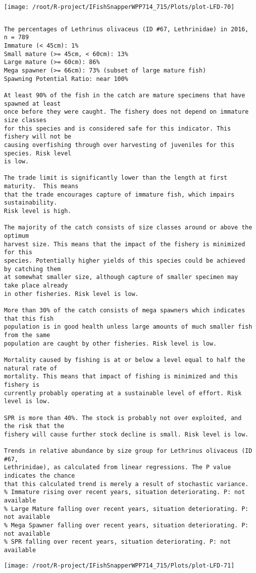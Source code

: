 \documentclass{report}\usepackage[]{graphicx}\usepackage[]{color}
\makeatletter
\def\maxwidth{ %
  \ifdim\Gin@nat@width>\linewidth
    \linewidth
  \else
    \Gin@nat@width
  \fi
}
\newenvironment{kframe}{%
 \def\at@end@of@kframe{}%
 \ifinner\ifhmode%
  \def\at@end@of@kframe{\end{minipage}}%
  \begin{minipage}{\columnwidth}%
 \fi\fi%
 \def\FrameCommand##1{\hskip\@totalleftmargin \hskip-\fboxsep
 \colorbox{shadecolor}{##1}\hskip-\fboxsep
     \hskip-\linewidth \hskip-\@totalleftmargin \hskip\columnwidth}%
 \MakeFramed {\advance\hsize-\width
   \@totalleftmargin\z@ \linewidth\hsize
   \@setminipage}}%
 {\par\unskip\endMakeFramed%
 \at@end@of@kframe}
\newenvironment{knitrout}{}{} %
\makeatother
\begin{document}
\begin{knitrout}
\texttt{[image: /root/R-project/IFishSnapperWPP714\_715/Plots/plot-LFD-70]} 
\begin{kframe}\begin{verbatim}
\end{verbatim}
\end{kframe}
\clearpage
\newpage
\begin{kframe}\begin{verbatim}The percentages of Lethrinus olivaceus (ID #67, Lethrinidae) in 2016, n = 789
Immature (< 45cm): 1%
Small mature (>= 45cm, < 60cm): 13%
Large mature (>= 60cm): 86%
Mega spawner (>= 66cm): 73% (subset of large mature fish)
Spawning Potential Ratio: near 100%
 
At least 90% of the fish in the catch are mature specimens that have spawned at least
once before they were caught. The fishery does not depend on immature size classes
for this species and is considered safe for this indicator. This fishery will not be
causing overfishing through over harvesting of juveniles for this species. Risk level
is low.

The trade limit is significantly lower than the length at first maturity.  This means
that the trade encourages capture of immature fish, which impairs sustainability.
Risk level is high.

The majority of the catch consists of size classes around or above the optimum
harvest size. This means that the impact of the fishery is minimized for this
species. Potentially higher yields of this species could be achieved by catching them
at somewhat smaller size, although capture of smaller specimen may take place already
in other fisheries. Risk level is low.

More than 30% of the catch consists of mega spawners which indicates that this fish
population is in good health unless large amounts of much smaller fish from the same
population are caught by other fisheries. Risk level is low.
 
Mortality caused by fishing is at or below a level equal to half the natural rate of
mortality. This means that impact of fishing is minimized and this fishery is
currently probably operating at a sustainable level of effort. Risk level is low.
 
SPR is more than 40%. The stock is probably not over exploited, and the risk that the
fishery will cause further stock decline is small. Risk level is low.
 
Trends in relative abundance by size group for Lethrinus olivaceus (ID #67,
Lethrinidae), as calculated from linear regressions. The P value indicates the chance
that this calculated trend is merely a result of stochastic variance.
% Immature rising over recent years, situation deteriorating. P: not available
% Large Mature falling over recent years, situation deteriorating. P: not available
% Mega Spawner falling over recent years, situation deteriorating. P: not available
% SPR falling over recent years, situation deteriorating. P: not available
\end{verbatim}
\end{kframe}
\texttt{[image: /root/R-project/IFishSnapperWPP714\_715/Plots/plot-LFD-71]} 


\end{knitrout}
\end{document}
